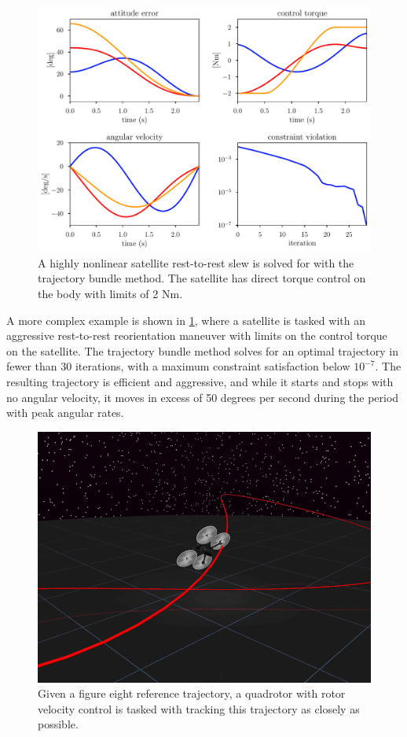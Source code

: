 \begin{figure}
    \centering
    \includegraphics[width=0.9\linewidth]{bundles/examples/satellite_fig_2.pdf}
    \caption{A highly nonlinear satellite rest-to-rest slew is solved for with the trajectory bundle method. The satellite has direct torque control on the body with limits of 2 Nm.}
    \label{fig:btb:satellite}
\end{figure}


A more complex example is shown in \ref{fig:btb:satellite}, where a satellite is tasked with an aggressive rest-to-rest reorientation maneuver with limits on the control torque on the satellite. The trajectory bundle method solves for an optimal trajectory in fewer than 30 iterations, with a maximum constraint satisfaction below $10^{-7}$. The resulting trajectory is efficient and aggressive, and while it starts and stops with no angular velocity, it moves in excess of 50 degrees per second during the period with peak angular rates.

\begin{figure}
    \centering
    \includegraphics[width=0.5\linewidth]{bundles/examples/drone_shot.png}
    \caption{Given a figure eight reference trajectory, a quadrotor with rotor velocity control is tasked with tracking this trajectory as closely as possible.}
    \label{fig:btb:drone_shot}
\end{figure}


